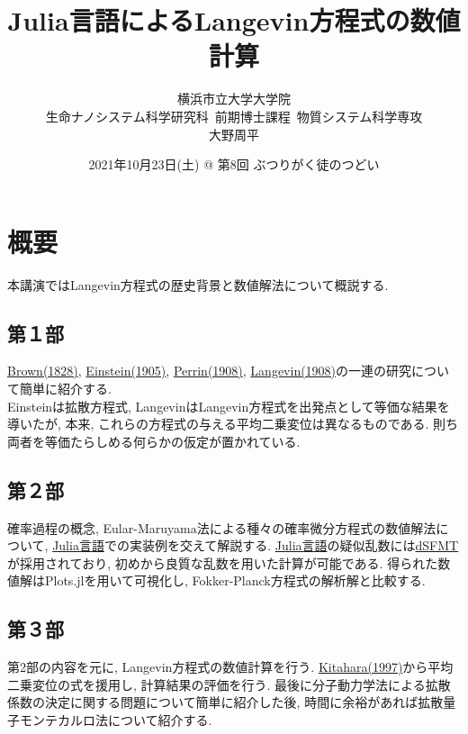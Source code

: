 \documentclass[a4paper,10.5pt]{jsarticle}
\title{Julia言語によるLangevin方程式の数値計算}
\author{横浜市立大学大学院\\
        生命ナノシステム科学研究科~前期博士課程~物質システム科学専攻\\
        大野周平}
\date{2021年10月23日(土) @ 第8回 ぶつりがく徒のつどい}
\begin{document}
  \maketitle

  \section*{概要}
    本講演ではLangevin方程式の歴史背景と数値解法について概説する.

  \subsection*{第１部}
    \href{https://doi.org/10.1080/14786442808674769}{Brown(1828)},
    \href{https://doi.org/10.1002/andp.19053220806}{Einstein(1905)},
    \href{https://gallica.bnf.fr/ark:/12148/bpt6k3100t/f969.item}{Perrin(1908)},
    \href{https://fr.wikisource.org/wiki/Sur_la_th%C3%A9orie_du_mouvement_brownien}{Langevin(1908)}の一連の研究について簡単に紹介する.\\
    Einsteinは拡散方程式, LangevinはLangevin方程式を出発点として等価な結果を導いたが, 本来, これらの方程式の与える平均二乗変位は異なるものである. 則ち両者を等価たらしめる何らかの仮定が置かれている.

  \subsection*{第２部}
    確率過程の概念, Eular-Maruyama法による種々の確率微分方程式の数値解法について, \href{https://julialang.org/}{Julia言語}での実装例を交えて解説する. \href{https://julialang.org/}{Julia言語}の疑似乱数には\href{http://www.math.sci.hiroshima-u.ac.jp/m-mat/MT/SFMT/index-jp.html/#dSFMT}{dSFMT}が採用されており, 初めから良質な乱数を用いた計算が可能である. 得られた数値解はPlots.jlを用いて可視化し, Fokker-Planck方程式の解析解と比較する.

  \subsection*{第３部}
    第2部の内容を元に, Langevin方程式の数値計算を行う. \href{https://www.iwanami.co.jp/book/b258377.html}{Kitahara(1997)}から平均二乗変位の式を援用し, 計算結果の評価を行う. 最後に分子動力学法による拡散係数の決定に関する問題について簡単に紹介した後, 時間に余裕があれば拡散量子モンテカルロ法について紹介する.
\end{document}
